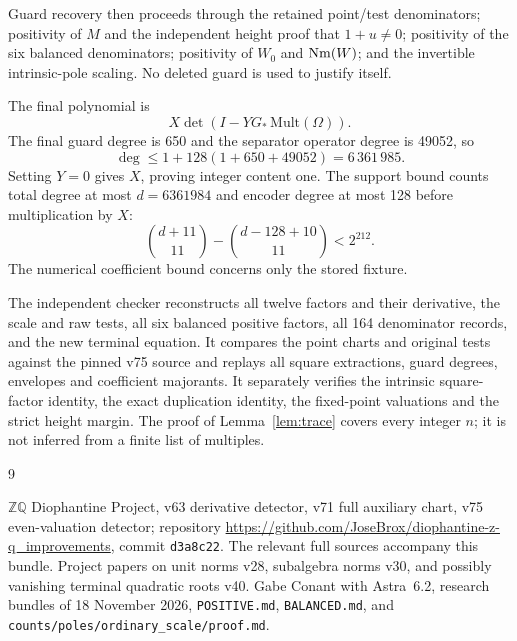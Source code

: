 \documentclass[11pt]{article}
\newcommand{\Q}{\mathbb Q}\newcommand{\Z}{\mathbb Z}
\begin{document}
Guard recovery then proceeds through
the retained point/test denominators; positivity of $M$ and the
independent height proof that $1+u\ne0$; positivity of the six balanced
denominators; positivity of $W_0$ and $\operatorname{Nm}(W)$; and the invertible
intrinsic-pole scaling. No deleted guard is used to justify itself.

The final polynomial is
\[
 X\det(I-YG_*\,\mathrm{Mult}(\Omega)).
\]
The final guard degree is 650 and the separator operator degree is
49052, so
\[
 \deg\le1+128(1+650+49052)=6\,361\,985.
\]
Setting $Y=0$ gives $X$, proving integer content one. The support
bound counts total degree at most $d=6361984$ and encoder degree at
most 128 before multiplication by $X$:
\[
 \binom{d+11}{11}-\binom{d-128+10}{11}<2^{212}.
\]
The numerical coefficient bound concerns only the stored fixture.

The independent checker reconstructs all twelve factors and their
derivative, the scale and raw tests, all six balanced positive factors,
all 164 denominator records, and the new terminal equation. It compares
the point charts and original tests against the pinned v75 source and
replays all square extractions, guard degrees, envelopes and coefficient
majorants. It separately verifies the intrinsic square-factor identity,
the exact duplication identity, the fixed-point valuations and the
strict height margin. The proof of Lemma~\ref{lem:trace} covers every
integer $n$; it is not inferred from a finite list of multiples.

\begin{thebibliography}{9}\raggedright
{} \(\Z\Q\) Diophantine Project, v63 derivative detector,
v71 full auxiliary chart, v75 even-valuation detector; repository
\url{https://github.com/JoseBrox/diophantine-z-q_improvements},
commit \texttt{d3a8c22}. The relevant full sources accompany this bundle.
 Project papers on unit norms v28, subalgebra norms v30,
and possibly vanishing terminal quadratic roots v40.
 Gabe Conant with Astra~6.2, research bundles of 18 November 2026,
\texttt{POSITIVE.md}, \texttt{BALANCED.md}, and
\texttt{counts/poles/ordinary\_scale/proof.md}.
\end{thebibliography}
\end{document}
